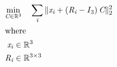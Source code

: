 \documentclass[12pt]{article}
\begin{document}
\begin{center}
\resizebox{\textwidth}{!} 
{
\begin{minipage}[c]{\textwidth}
\begin{align*}
 \omit \span \begin{aligned} \min_{\textit{C} \in \mathbb{R}^{ 3}} \quad & \sum_\textit{i} \|\textit{x}_{ \textit{i} } + \left( \textit{R}_{ \textit{i} } - I_{ 3 } \right)\textit{C}\|_2^{2} \\
\end{aligned} \\
\intertext{where} 
\textit{x}_{\textit{i}} & \in \mathbb{R}^{ 3} \\
\textit{R}_{\textit{i}} & \in \mathbb{R}^{ 3 \times 3 } \\
\\
\end{align*}
\end{minipage}
}
\end{center}
\end{document}
